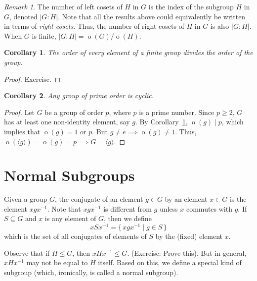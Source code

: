 \documentclass[svgnames]{article}
\newtheorem{Corollary}[Corollary]{Corollary}
\theoremstyle{definition}
\theoremstyle{remark}
\newtheorem*{Remark*}{Remark}
\DeclareMathOperator{\ord}{o}
\newcommand{\newterm}[1]{{\color{alertcolor} #1}}
\begin{document}
\begin{Remark*}\label{def:SubgroupIndex}
The number of left cosets of $H$ in $G$ is the \newterm{index of the subgroup $H$ in $G$}, denoted $|G : H|$. Note that all the results above could equivalently be written in terms of \emph{right cosets}. Thus, the number of right cosets of $H$ in $G$ is also $|G : H|$. When $G$ is finite, $|G : H| = \ord(G)/\ord(H)$.
\end{Remark*}

\begin{Corollary}\label{cor:OrderElem}
The order of every element of a finite group divides the order of the group.
\end{Corollary}

\begin{proof}
Exercise.
\end{proof}

\begin{Corollary}\label{cor:Prime=>Cyc}
Any group of prime order is cyclic.
\end{Corollary}

\begin{proof}
Let $G$ be a group of order $p$, where $p$ is a prime number. Since $p \ge 2$, $G$ has at least one non-identity element, say $g$. By Corollary~\ref{cor:OrderElem}, $\ord(g) \mid p$, which implies that $\ord(g) = 1$ or $p$. But $g \ne e \implies \ord(g) \ne 1$. Thus, $\ord(\langle g \rangle) = \ord(g) = p \implies G = \langle g \rangle$.
\end{proof}

\section{Normal Subgroups}\label{sec:NormSubs}
Given a group $G$, the \newterm{conjugate} of an element $g \in G$ by an element $x \in G$ is the element $xgx^{-1}$. Note that $xgx^{-1}$ is different from $g$ unless $x$ commutes with $g$. If $S \subseteq G$ and $x$ is any element of $G$, then we define
\begin{equation*}
xSx^{-1} = \{\, xgx^{-1} \mid g \in S \,\}
\end{equation*}
which is the set of all conjugates of elements of $S$ by the (fixed) element $x$.

Observe that if $H \le G$, then $xHx^{-1} \le G$. {\small (Exercise: Prove this)}. But in general, $xHx^{-1}$ may not be equal to $H$ itself. Based on this, we define a special kind of subgroup (which, ironically, is called a \newterm{normal} subgroup).
\end{document}

